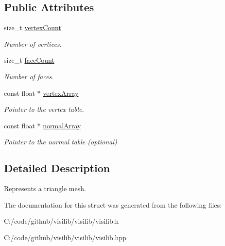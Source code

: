\subsection*{Public Attributes}
\begin{DoxyCompactItemize}
\item 
\mbox{\label{structvisilib_1_1_discrete_geometry_description_af027f5588becd10f57feacdd969c36e8}} 
size\+\_\+t \mbox{\hyperlink{structvisilib_1_1_discrete_geometry_description_af027f5588becd10f57feacdd969c36e8}{vertex\+Count}}
\begin{DoxyCompactList}\small\item\em Number of vertices. \end{DoxyCompactList}\item 
\mbox{\label{structvisilib_1_1_discrete_geometry_description_ad3e0036614577235871af289b06e9153}} 
size\+\_\+t \mbox{\hyperlink{structvisilib_1_1_discrete_geometry_description_ad3e0036614577235871af289b06e9153}{face\+Count}}
\begin{DoxyCompactList}\small\item\em Number of faces. \end{DoxyCompactList}\item 
\mbox{\label{structvisilib_1_1_discrete_geometry_description_ae4c6fc2ef794048d08127ffec2963ff9}} 
const float $\ast$ \mbox{\hyperlink{structvisilib_1_1_discrete_geometry_description_ae4c6fc2ef794048d08127ffec2963ff9}{vertex\+Array}}
\begin{DoxyCompactList}\small\item\em Pointer to the vertex table. \end{DoxyCompactList}\item 
\mbox{\label{structvisilib_1_1_discrete_geometry_description_acfd5e09da7d73d29b54380455db56e37}} 
const float $\ast$ \mbox{\hyperlink{structvisilib_1_1_discrete_geometry_description_acfd5e09da7d73d29b54380455db56e37}{normal\+Array}}
\begin{DoxyCompactList}\small\item\em Pointer to the normal table (optional) \end{DoxyCompactList}\end{DoxyCompactItemize}


\subsection{Detailed Description}
Represents a triangle mesh. 

The documentation for this struct was generated from the following files\+:\begin{DoxyCompactItemize}
\item 
C\+:/code/github/visilib/visilib/visilib.\+h\item 
C\+:/code/github/visilib/visilib/visilib.\+hpp\end{DoxyCompactItemize}
